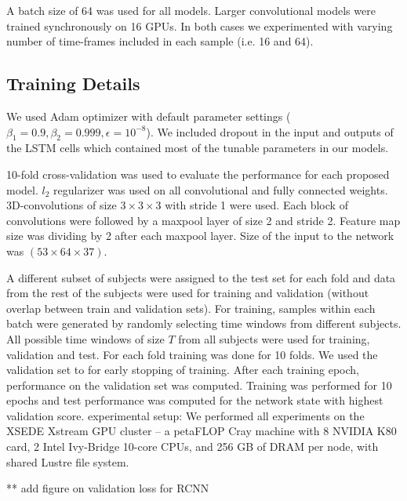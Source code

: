 \documentclass{article}
\begin{document}
A batch size of 64 was used for all models. Larger convolutional models were trained synchronously on 16 GPUs. In both cases we experimented with varying number of time-frames included in each sample (i.e. 16 and 64).

\subsection{Training Details}
\label{training_details}
We used Adam optimizer with default parameter settings ($\beta_1=0.9, \beta_2=0.999, \epsilon=10^{-8}$). We included dropout in the input and outputs of the LSTM cells \citep{Zaremba2014} which contained most of the tunable parameters in our models. 

10-fold cross-validation was used to evaluate the performance for each proposed model. $l_2$ regularizer was used on all convolutional and fully connected weights. 
3D-convolutions of size $3\times3\times3$ with stride 1 were used. Each block of convolutions were followed by a maxpool layer of size 2 and stride 2. Feature map size was dividing by 2 after each maxpool layer. Size of the input to the network was $(53\times64\times37)$.

A different subset of subjects were assigned to the test set for each fold and data from the rest of the subjects were used for training and validation (without overlap between train and validation sets). For training, samples within each batch were generated by randomly selecting time windows from different subjects. All possible time windows of size $T$ from all subjects were used for training, validation and test. For each fold training was done for 10 folds. We used the validation set to for early stopping of training. After each training epoch, performance on the validation set was computed. Training was performed for 10 epochs and test performance was computed for the network state with highest validation score. 
experimental setup: We performed all experiments on the XSEDE Xstream GPU cluster \citep{Towns2014} -- a petaFLOP Cray machine with 8 NVIDIA K80 card, 2 Intel Ivy-Bridge 10-core CPUs, and 256 GB of DRAM per node, with shared Lustre file system.


** add figure on validation loss for RCNN
\end{document}
